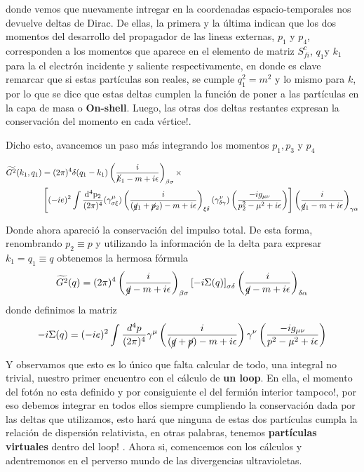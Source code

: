 \documentclass{article}
\numberwithin{equation}{section}
\begin{document}
donde vemos que nuevamente intregar en la coordenadas espacio-temporales nos devuelve deltas de Dirac. De ellas, la primera y la última indican que los dos momentos del desarrollo del propagador de las lineas externas, $p_{1}$ y $p_{4}$, corresponden a los momentos que aparece en el elemento de matriz $S_{fi}^{c}$, $q_{1}$y $k_{1}$ para la el electrón incidente y saliente respectivamente, en donde es clave remarcar que si estas partículas son reales, se cumple $q_{1}^{2}=m^{2}$ y lo mismo para $k$, por lo que se dice que estas deltas cumplen la función de poner a las partículas en la capa de masa o
\textbf{On-shell}. Luego, las otras dos deltas restantes expresan la conservación del momento en cada vértice!.

Dicho esto, avancemos un paso más integrando los momentos $ p_1,p_3 $ y $ p_4 $

\begin{equation}
\begin{aligned}
\widetilde{G^{2}}(k_{1},q_{1})&=(2\pi)^{4}\delta(q_{1}-k_{1})\left(\frac{i}{\cancel{k}_{1}-m+i\epsilon}\right)_{\beta\sigma}\times\\
&\left[(-ie)^{2}\int\frac{\mathrm{d^{4}p_2}}{(2\pi)^{4}}(\gamma_{\sigma\xi}^{\mu})\left(\frac{i}{(\cancel{q}_{1}+\cancel{p}_2)-m+i\epsilon}\right)_{\xi\delta}(\gamma_{\delta\gamma}^{\nu})\left(\frac{-ig_{\mu\nu}}{p_2^{2}-\mu^{2}+i\epsilon}\right) \right] \left(\frac{i}{\cancel{q}_{1}-m+i\epsilon}\right)_{\gamma\alpha}
\end{aligned}
\end{equation}

Donde ahora apareció la conservación del impulso total. De esta forma,
renombrando $p_2\equiv p$ y utilizando la información de
la delta para expresar $k_{1}=q_{1}\equiv q$ obtenemos la hermosa
fórmula
\begin{equation}
\widetilde{G^{2}}(q)=(2\pi)^{4}\left(\frac{i}{\cancel{q}-m+i\epsilon}\right)_{\beta\sigma} \left[-i\Sigma(q)\right]_{\sigma \delta} \left(\frac{i}{\cancel{q}-m+i\epsilon}\right)_{\delta \alpha}
\end{equation}
donde definimos la matriz
\begin{equation}
-i\Sigma(q)=(-ie)^{2}\int\frac{d^{4}p}{(2\pi)^{4}}\gamma^{\mu}\left(\frac{i}{(\cancel{q}+\cancel{p})-m+i\epsilon}\right)\gamma^{\nu}\left(\frac{-ig_{\mu\nu}}{p^{2}-\mu^{2}+i\epsilon}\right)
\end{equation}

Y observamos que esto es lo único que falta calcular de todo, una
integral no trivial, nuestro primer encuentro con el cálculo de \textbf{un
	loop}. En ella, el momento del fotón no esta definido y por consiguiente
el del fermión interior tampoco!, por eso debemos integrar en todos
ellos siempre cumpliendo la conservación dada por las deltas que utilizamos,
esto hará que ninguna de estas dos partículas cumpla la relación de
dispersión relativista, en otras palabras, tenemos \textbf{partículas
	virtuales} dentro del loop! . Ahora si, comencemos con los cálculos
y adentremonos en el perverso mundo de las divergencias ultravioletas.
\end{document}
